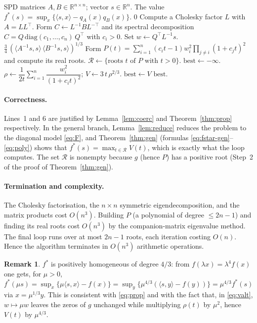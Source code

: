 \documentclass{amsart}
\theoremstyle{definition}
\newtheorem{remark}{Remark}
\begin{document}
\begin{algorithm}[h]
\caption{Evaluation of $f^\ast(s)$ for $f=q_Aq_B$, $A,B$ SPD}
\begin{algorithmic}[1]
\Require SPD matrices $A,B\in\mathbb R^{n\times n}$; vector $s\in\mathbb R^n$.
\Ensure The value $f^\ast(s)=\sup_x\{\langle s,x\rangle-q_A(x)q_B(x)\}$.
 \Return $0$ \EndIf
\State Compute a Cholesky factor $L$ with $A=LL^{\top}$.
\State Form $C\gets L^{-1}BL^{-\top}$ and its spectral decomposition
       $C=Q\,\mathrm{diag}(c_1,\dots,c_n)\,Q^{\top}$ with $c_i>0$.
\State Set $w\gets Q^{\top}L^{-1}s$.
   \State \Return $\tfrac34\,(\langle A^{-1}s,s\rangle\,\langle B^{-1}s,s\rangle)^{1/3}$
\EndIf
\State Form $P(t)=\sum_{i=1}^n (c_i t-1)w_i^2\prod_{j\neq i}(1+c_j t)^2$ and compute its real roots.
\State $\mathcal R\gets\{\text{roots }t\text{ of }P\text{ with } t>0\}$.
\State $\mathrm{best}\gets -\infty$.
   \State $\rho\gets \dfrac{1}{2t}\sum_{i=1}^n \dfrac{w_i^2}{(1+c_i t)^2}$;\quad
          $V\gets 3\,t\,\rho^{2/3}$.
    $\mathrm{best}\gets V$ \EndIf
\EndFor
\State \Return $\mathrm{best}$.
\end{algorithmic}
\end{algorithm}

\paragraph{Correctness.}
Lines~1 and 6 are justified by Lemma~\ref{lem:coerc} and Theorem~\ref{thm:prop} respectively.  In
the general branch, Lemma~\ref{lem:reduce} reduces the problem to the diagonal model \eqref{eq:F},
and Theorem~\ref{thm:gen} (formulas \eqref{eq:fstar-gen}--\eqref{eq:poly}) shows that
$f^\ast(s)=\max_{t\in\mathcal R}V(t)$, which is exactly what the loop computes.  The set
$\mathcal R$ is nonempty because $g$ (hence $P$) has a positive root (Step~2 of the proof of
Theorem~\ref{thm:gen}).

\paragraph{Termination and complexity.}
The Cholesky factorisation, the $n\times n$ symmetric eigendecomposition, and the matrix products
cost $O(n^3)$.  Building $P$ (a polynomial of degree $\le 2n-1$) and finding its real roots cost
$O(n^3)$ by the companion-matrix eigenvalue method.  The final loop runs over at most $2n-1$ roots,
each iteration costing $O(n)$.  Hence the algorithm terminates in $O(n^3)$ arithmetic operations.

\begin{remark}
$f^\ast$ is positively homogeneous of degree $4/3$: from $f(\lambda x)=\lambda^4 f(x)$ one gets, for
$\mu>0$, $f^\ast(\mu s)=\sup_x\{\mu\langle s,x\rangle-f(x)\}=\sup_y\{\mu^{4/3}(\langle s,y\rangle-f(y))\}
=\mu^{4/3}f^\ast(s)$ via $x=\mu^{1/3}y$.  This is consistent with \eqref{eq:prop} and with the fact
that, in \eqref{eq:valt}, $w\mapsto\mu w$ leaves the zeros of $g$ unchanged while multiplying
$\rho(t)$ by $\mu^2$, hence $V(t)$ by $\mu^{4/3}$.
\end{remark}
\end{document}
